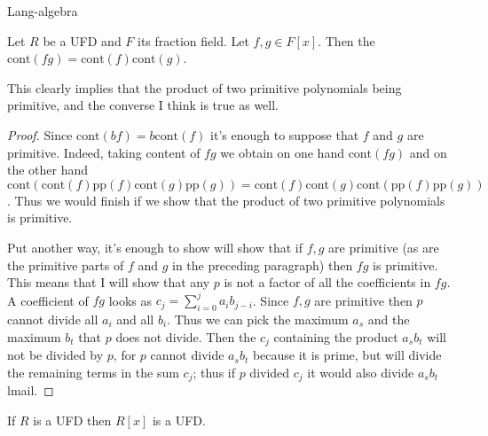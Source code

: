 \begin{lemma}
\label{lemma-true-Gauss}
\begin{reference}
\cite{Chapter 4, Theorem 2.1}{Lang-algebra}
\end{reference}
Let $R$ be a UFD and $F$ its fraction field. Let $f,g\in F[x]$. Then the
$\text{cont}(fg)=\text{cont}(f)\text{cont}(g)$.
\end{lemma}

This clearly implies that the product of two primitive polynomials being
primitive, and the converse I think is true as well.

\begin{proof}
Since $\text{cont}(bf)=b\text{cont}(f)$ it's enough to suppose that  $f$ and $g$
are primitive. Indeed, taking content of $fg$ we obtain on one hand
$\text{cont}(fg)$ and on the other hand
$\text{cont}(\text{cont}(f)\text{pp}(f)\text{cont}(g)\text{pp}(g))
=\text{cont}(f)\text{cont}(g)\text{cont}(\text{pp}(f)\text{pp}(g))$. 
Thus we would finish if we show that the product of two primitive polynomials is
primitive.

Put another way, it's enough to show will show that if $f,g$ are primitive (as
are the primitive parts of $f$ and $g$ in the preceding paragraph) then $fg$ is
primitive. This means that I will show that any $p$ is not a factor of all the
coefficients in $fg$. A coefficient of $fg$ looks as
$c_j=\sum_{i=0}^ja_ib_{j-i}$.  Since $f,g$ are primitive then $p$ cannot divide
all $a_i$ and all $b_i$.  Thus we can pick the maximum $a_s$ and the maximum
$b_t$ that $p$ does not divide. Then the $c_j$ containing the product $a_sb_t$
will not be divided by $p$, for $p$ cannot divide $a_sb_t$ because it is prime,
but will divide the remaining terms in the sum $c_j$; thus if $p$ divided $c_j$
it would also divide $a_sb_t$lmail.
\end{proof}

\begin{lemma}
\label{lemma-R-UFD-implies-R[x]-UFD}
\begin{reference}
\cite[Chapter 4, Theorem 2.3]{Lang-algebra}
\end{reference}
If $R$ is a UFD then $R[x]$ is a UFD.
\end{lemma}

